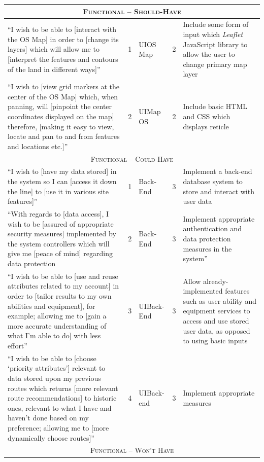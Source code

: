 \documentclass[11pt, english]{article}
\begin{document}
\begin{center}
\begin{longtable}{p{4cm}lp{1.5cm}lp{4cm}}
			\hline
			\multicolumn{5}{c}{\textsc{Functional -- Should-Have}}\\
			\hline
			``I wish to be able to [interact with the OS Map] in order to [change its layers] which will allow me to [interpret the features and contours of the land in different ways]'' & 1 & UI\newline OS Map & 2 & Include some form of input which \textit{Leaflet} JavaScript library to allow the user to change primary map layer\\
			``I wish to [view grid markers at the center of the OS Map] which, when panning, will [pinpoint the center coordinates displayed on the map] therefore, [making it easy to view, locate and pan to and from features and locations etc.]'' & 2 & UI\newline Map OS & 2 & Include basic HTML and CSS which displays reticle\\
			\hline
			\multicolumn{5}{c}{\textsc{Functional -- Could-Have}}\\
			\hline
			``I wish to [have my data stored] in the system so I can [access it down the line] to [use it in various site features]'' & 1 & Back-End & 3 & Implement a back-end database system to store and interact with user data\\
			``With regards to [data access], I wish to be [assured of appropriate security measures] implemented by the system controllers which will give me [peace of mind] regarding data protection & 2 & Back-End & 3 & Implement appropriate authentication and data protection measures in the system''\\
			``I wish to be able to [use and reuse attributes related to my account] in order to [tailor results to my own abilities and equipment], for example; allowing me to [gain a more accurate understanding of what I'm able to do] with less effort'' & 3 & UI\newline Back-End & 3 & Allow already-implemented features such as user ability and equipment services to access and use stored user data, as opposed to using basic inputs\\
			``I wish to be able to [choose `priority attributes'] relevant to data stored upon my previous routes which returns [more relevant route recommendations] to historic ones, relevant to what I have and haven't done based on my preference; allowing me to [more dynamically choose routes]'' & 4 & UI\newline Back-end & 3 & Implement appropriate measures\\
			\hline
			\multicolumn{5}{c}{\textsc{Functional -- Won't Have}}\\

\end{longtable}
\end{center}
\end{document}
